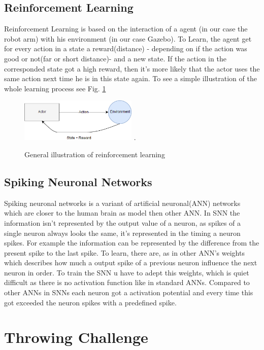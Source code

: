 \subsection{Reinforcement Learning}
Reinforcement Learning is based on the interaction of a agent (in our case the robot arm) with his environment (in our case Gazebo). To Learn, the agent get for every action in a state a reward(distance) - depending on if the action was good or not(far or short distance)- and a new state. If the action in the corresponded state got a high reward, then it's more likely that the actor uses the same action next time he is in this state again. To see a simple illustration of the whole learning process see Fig. \ref{re_base}
\begin{figure}[H]
	\centering
	\includegraphics[width=2.2in]{img/re_base.png}
	\DeclareGraphicsExtensions.
	\caption{General illustration of reinforcement learning}
	\label{re_base}
\end{figure}

\subsection{Spiking Neuronal Networks}
Spiking neuronal networks is a variant of artificial neuronal(ANN) networks which are closer to the human brain as model then other ANN. In SNN the information isn't represented by the output value of a neuron, as spikes of a single neuron always looks the same, it's represented in the timing a neuron spikes. For example the information can be represented by the difference from the present spike to the last spike. To learn, there are, as in other ANN's weights which describes how much a output spike of a previous neuron influence the next neuron in order. To train the SNN u have to adept this weights, which is quiet difficult as there is no activation function like in standard ANNs. Compared to other ANNs in SNNs each neuron got a activation potential and every time this got exceeded the neuron spikes with a predefined spike.

\section{Throwing Challenge}
